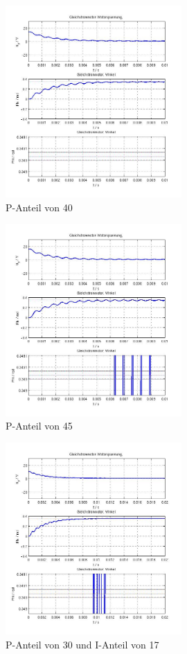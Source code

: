 \begin{figure}[ht]
	\centering
	\includegraphics[width=0.6\textwidth]{NurP40.jpg}
	\caption{P-Anteil von 40}
	\label{p40}
\end{figure}


\begin{figure}[ht]
	\centering
	\includegraphics[width=0.6\textwidth]{NurP45.jpg}
	\caption{P-Anteil von 45}
	\label{p45}
\end{figure}


\begin{figure}[ht]
	\centering
	\includegraphics[width=0.6\textwidth]{PI-P30I17.jpg}
	\caption{P-Anteil von 30 und I-Anteil von 17}
	\label{p30i17}
\end{figure}


